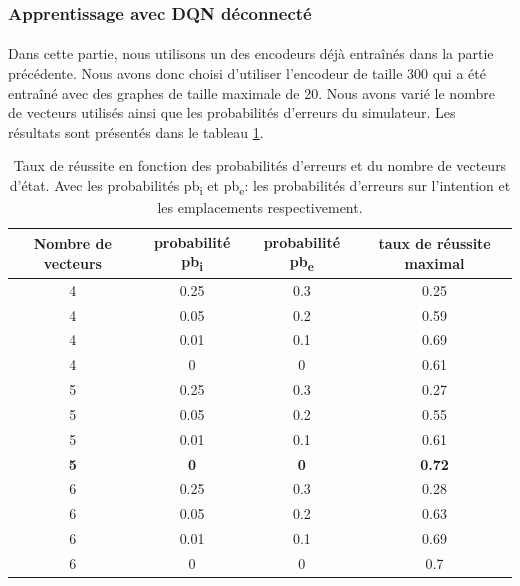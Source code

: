 \subsubsection{Apprentissage avec DQN déconnecté}
\paragraph{}Dans cette partie, nous utilisons un des encodeurs déjà entraînés dans la partie précédente. Nous avons donc choisi d'utiliser l'encodeur de taille 300 qui a été entraîné avec des graphes de taille maximale de 20. Nous avons varié le nombre de vecteurs utilisés ainsi que les probabilités d'erreurs du simulateur. Les résultats sont présentés dans le tableau \ref{table_results_dis}.
\begin{table}[H]
	\begin{center}
		
		\begin{tabular}{|c|c|c|c|}
			\hline
			\textbf{Nombre de vecteurs} & \textbf{probabilité pb\textsubscript{i}} & \textbf{probabilité pb\textsubscript{e}} & \textbf{taux de réussite maximal}\\
			\hline
			4 & 0.25 & 0.3 & 0.25\\
			\hline
			4 & 0.05 & 0.2 & 0.59\\
			\hline
			\rowcolor{LightCyan}
			4 & 0.01 & 0.1 & 0.69\\
			\hline
			4 & 0 & 0 & 0.61\\
			\hline
			5 & 0.25 & 0.3 & 0.27\\
			\hline
			5 & 0.05 & 0.2 & 0.55\\
			\hline
			5 & 0.01 & 0.1 & 0.61\\
			\hline
			\textbf{5} & \textbf{0} & \textbf{0} & \textbf{0.72}\\
			\hline
			6 & 0.25 & 0.3 & 0.28\\
			\hline
			6 & 0.05 & 0.2 & 0.63\\
			\hline
			\rowcolor{LightCyan}
			6 & 0.01 & 0.1 & 0.69\\
			\hline
			6 & 0 & 0 & 0.7\\
			\hline
		\end{tabular}
		\caption{Taux de réussite en fonction des probabilités d'erreurs et du nombre de vecteurs d'état. Avec les probabilités pb\textsubscript{i} et pb\textsubscript{e}: les probabilités d'erreurs sur l'intention et les emplacements respectivement.}\label{table_results_dis}
	\end{center}
\end{table}
